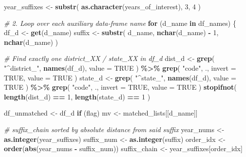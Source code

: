 \documentclass[
]{article}
\newenvironment{Shaded}{\begin{snugshade}}{\end{snugshade}}
\newcommand{\AttributeTok}[1]{\textcolor[rgb]{0.13,0.29,0.53}{#1}}
\newcommand{\CommentTok}[1]{\textcolor[rgb]{0.56,0.35,0.01}{\textit{#1}}}
\newcommand{\ConstantTok}[1]{\textcolor[rgb]{0.56,0.35,0.01}{#1}}
\newcommand{\ControlFlowTok}[1]{\textcolor[rgb]{0.13,0.29,0.53}{\textbf{#1}}}
\newcommand{\DecValTok}[1]{\textcolor[rgb]{0.00,0.00,0.81}{#1}}
\newcommand{\FunctionTok}[1]{\textcolor[rgb]{0.13,0.29,0.53}{\textbf{#1}}}
\newcommand{\NormalTok}[1]{#1}
\newcommand{\OtherTok}[1]{\textcolor[rgb]{0.56,0.35,0.01}{#1}}
\newcommand{\SpecialCharTok}[1]{\textcolor[rgb]{0.81,0.36,0.00}{\textbf{#1}}}
\newcommand{\StringTok}[1]{\textcolor[rgb]{0.31,0.60,0.02}{#1}}
\begin{document}
\begin{Shaded}
\begin{Highlighting}[]
\NormalTok{    year\_suffixes }\OtherTok{\textless{}{-}} \FunctionTok{substr}\NormalTok{(}
        \FunctionTok{as.character}\NormalTok{(years\_of\_interest),}
        \DecValTok{3}\NormalTok{, }\DecValTok{4}
\NormalTok{    )}

    \CommentTok{\# 2. Loop over each auxiliary data{-}frame name}
    \ControlFlowTok{for}\NormalTok{ (d\_name }\ControlFlowTok{in}\NormalTok{ df\_names) \{}
\NormalTok{        df\_d }\OtherTok{\textless{}{-}} \FunctionTok{get}\NormalTok{(d\_name)}
\NormalTok{        suffix }\OtherTok{\textless{}{-}} \FunctionTok{substr}\NormalTok{(}
\NormalTok{            d\_name, }\FunctionTok{nchar}\NormalTok{(d\_name) }\SpecialCharTok{{-}}
                \DecValTok{1}\NormalTok{, }\FunctionTok{nchar}\NormalTok{(d\_name)}
\NormalTok{        )}

        \CommentTok{\# Find exactly one district\_XX / state\_XX in df\_d}
\NormalTok{        dist\_d }\OtherTok{\textless{}{-}} \FunctionTok{grep}\NormalTok{(}
            \StringTok{"\^{}district\_"}\NormalTok{, }\FunctionTok{names}\NormalTok{(df\_d),}
            \AttributeTok{value =} \ConstantTok{TRUE}
\NormalTok{        ) }\SpecialCharTok{\%\textgreater{}\%}
            \FunctionTok{grep}\NormalTok{(}
                \StringTok{"code"}\NormalTok{, ., }\AttributeTok{invert =} \ConstantTok{TRUE}\NormalTok{,}
                \AttributeTok{value =} \ConstantTok{TRUE}
\NormalTok{            )}
\NormalTok{        state\_d }\OtherTok{\textless{}{-}} \FunctionTok{grep}\NormalTok{(}
            \StringTok{"\^{}state\_"}\NormalTok{, }\FunctionTok{names}\NormalTok{(df\_d),}
            \AttributeTok{value =} \ConstantTok{TRUE}
\NormalTok{        ) }\SpecialCharTok{\%\textgreater{}\%}
            \FunctionTok{grep}\NormalTok{(}
                \StringTok{"code"}\NormalTok{, ., }\AttributeTok{invert =} \ConstantTok{TRUE}\NormalTok{,}
                \AttributeTok{value =} \ConstantTok{TRUE}
\NormalTok{            )}
        \FunctionTok{stopifnot}\NormalTok{(}
            \FunctionTok{length}\NormalTok{(dist\_d) }\SpecialCharTok{==}
                \DecValTok{1}\NormalTok{, }\FunctionTok{length}\NormalTok{(state\_d) }\SpecialCharTok{==}
                \DecValTok{1}
\NormalTok{        )}

\NormalTok{        df\_unmatched }\OtherTok{\textless{}{-}}\NormalTok{ df\_d}
        \ControlFlowTok{if}\NormalTok{ (flag)}
\NormalTok{            mv }\OtherTok{\textless{}{-}}\NormalTok{ matched\_lists[[d\_name]]}

        \CommentTok{\# suffix\_chain sorted by absolute distance from said suffix}
\NormalTok{        year\_nums }\OtherTok{\textless{}{-}} \FunctionTok{as.integer}\NormalTok{(year\_suffixes)}
\NormalTok{        suffix\_num }\OtherTok{\textless{}{-}} \FunctionTok{as.integer}\NormalTok{(suffix)}
\NormalTok{        order\_idx }\OtherTok{\textless{}{-}} \FunctionTok{order}\NormalTok{(}\FunctionTok{abs}\NormalTok{(year\_nums }\SpecialCharTok{{-}}\NormalTok{ suffix\_num))}
\NormalTok{        suffix\_chain }\OtherTok{\textless{}{-}}\NormalTok{ year\_suffixes[order\_idx]}


\end{Highlighting}
\end{Shaded}
\end{document}
